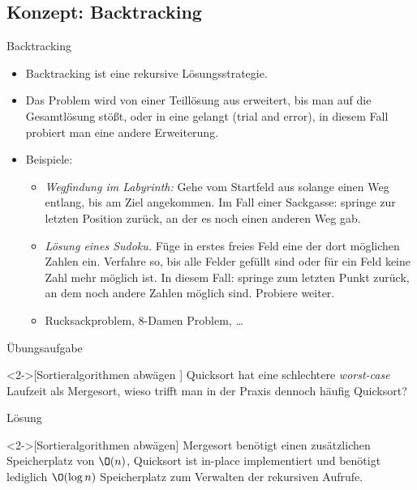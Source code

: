 \subsection{Konzept: Backtracking}

\begin{frame}{Backtracking}
    \begin{itemize}[<+(1)->]
        \item Backtracking ist eine rekursive Lösungsstrategie.
        \item Das Problem wird von einer Teillösung aus erweitert, bis man auf die Gesamtlösung stößt,\pause{} oder in eine  gelangt (trial and error), in diesem Fall probiert man eine andere Erweiterung.
        \item Beispiele: \begin{itemize}
            \item \emph{Wegfindung im Labyrinth:}\pause{} Gehe vom Startfeld aus solange einen Weg entlang, bis am Ziel angekommen.\pause{} Im Fall einer Sackgasse: springe zur letzten Position zurück, an der es noch einen anderen Weg gab.
            \item \emph{Lösung eines Sudoku.}\pause{} Füge in erstes freies Feld eine der dort möglichen Zahlen ein.\pause{} Verfahre so, bis alle Felder gefüllt sind oder für ein Feld keine Zahl mehr möglich ist.\pause{} In diesem Fall: springe zum letzten Punkt zurück, an dem noch andere Zahlen möglich sind. Probiere weiter.
            \item Rucksackproblem, 8-Damen Problem, \ldots
        \end{itemize}
    \end{itemize}
\end{frame}

\ifull
\begin{frame}[c]{Übungsaufgabe}
    \begin{exercise}<2->[Sortieralgorithmen abwägen ]
        Quicksort hat eine schlechtere \emph{worst-case} Laufzeit als Mergesort, wieso trifft man in der Praxis dennoch häufig Quicksort?
    \end{exercise}
\end{frame}

\begin{frame}[c]{Lösung}
    \begin{solve}<2->[Sortieralgorithmen abwägen]
        \pause{}Mergesort benötigt einen zusätzlichen Speicherplatz von \(\O(n)\), Quicksort ist in-place implementiert und benötigt lediglich \(\O(\log n)\) Speicherplatz zum Verwalten der rekursiven Aufrufe.
    \end{solve}
\end{frame}

